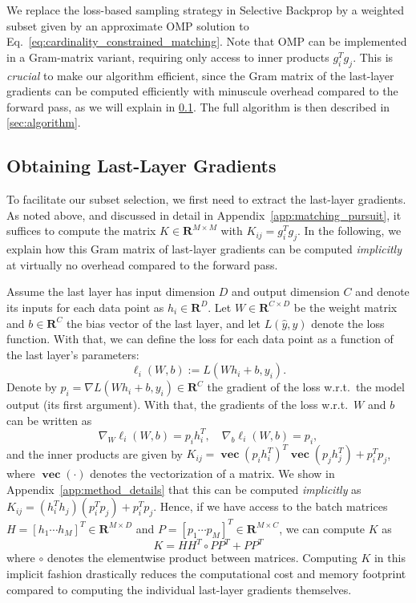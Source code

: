 \documentclass{article}
\newcommand{\R}{\mathbf{R}}
\DeclareMathOperator{\vectorize}{\mathbf{vec}}
\theoremstyle{plain}
\theoremstyle{definition}
\theoremstyle{remark}
\begin{document}
We replace the loss-based sampling strategy in Selective Backprop by a weighted subset given by an approximate OMP solution to Eq.~\eqref{eq:cardinality_constrained_matching}.
Note that OMP can be implemented in a Gram-matrix variant, requiring only access to inner products $g_i^T g_j$.
This is \emph{crucial} to make our algorithm efficient, since the Gram matrix of the last-layer gradients can be computed efficiently with minuscule overhead compared to the forward pass, as we will explain in \textsection\ref{sec:last_layer_grads}.
The full algorithm is then described in \textsection\ref{sec:algorithm}.



\subsection{Obtaining Last-Layer Gradients}
\label{sec:last_layer_grads}

To facilitate our subset selection, we first need to extract the last-layer gradients.
As noted above, and discussed in detail in Appendix~\ref{app:matching_pursuit},
it suffices to compute the matrix $K\in\R^{M\times M}$ with $K_{ij} = g_i^T g_j$.
In the following, we explain how this Gram matrix of last-layer gradients can be computed \emph{implicitly} at virtually no overhead compared to the forward pass.

Assume the last layer has input dimension $D$ and output dimension $C$ and denote its inputs for each data point as $h_i \in \R^D$.
Let $W\in \R^{C\times D}$ be the weight matrix and $b\in \R^C$ the bias vector of the last layer, and let $L(\hat{y}, y)$ denote the loss function.
With that, we can define the loss for each data point as a function of the last layer's parameters:
\begin{equation}
    \label{eq:last_layer_loss}
    \ell_i(W, b) := L(Wh_i + b, y_i).
\end{equation}
Denote by $p_i = \nabla L(Wh_i + b, y_i) \in \R^C$ the gradient of the loss w.r.t.~the model output (its first argument).
With that, the gradients of the loss w.r.t.~$W$ and $b$ can be written as
\begin{equation}
    \nabla_W \ell_i(W, b) = p_i h_i^T, \quad \nabla_b \ell_i(W, b) = p_i,
\end{equation}
and the inner products are given by $K_{ij}  = \vectorize(p_i h_i^T)^T \vectorize(p_j h_j^T) + p_i^T p_j$, where $\vectorize(\cdot)$ denotes the vectorization of a matrix.
We show in Appendix~\ref{app:method_details} that this can be computed \emph{implicitly} as $K_{ij} = (h_i^T h_j) (p_i^T p_j) + p_i^T p_j$.
Hence, if we have access to the batch matrices $H = [h_1 \cdots h_M]^T \in \R^{M\times D}$ and
$P = [p_1 \cdots p_M]^T \in \R^{M\times C}$, we can compute $K$ as
\begin{equation}
    K = HH^T \circ PP^T + PP^T
\end{equation}
where $\circ$ denotes the elementwise product between matrices. Computing $K$ in this implicit fashion drastically reduces the computational cost and memory footprint compared to computing the individual last-layer gradients themselves.
\end{document}
